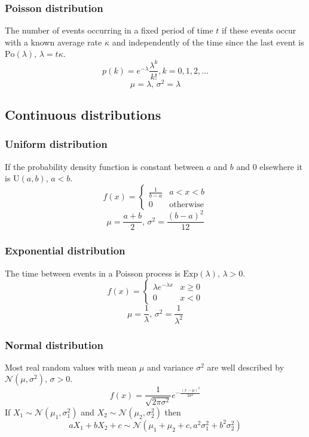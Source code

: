 \subsubsection{Poisson distribution}
The number of events occurring in a fixed period of time $t$ if these events occur with a known average rate $\kappa$ and independently of the time since the last event is $\textrm{Po}(\lambda),\,\lambda=t\kappa$.
\[p(k)=e^{-\lambda}\frac{\lambda^k}{k!}, k=0,1,2,\dots\]
\[\mu=\lambda,\,\sigma^2=\lambda\]

\subsection{Continuous distributions}

\subsubsection{Uniform distribution}
If the probability density function is constant between $a$ and $b$ and 0 elsewhere it is $\textrm{U}(a,b),\,a<b$.
\[f(x) = \left\{
	\begin{array}{cl}
		\frac{1}{b-a} & a<x<b\\
		0 & \textrm{otherwise}
	\end{array}\right.\]
	\[\mu=\frac{a+b}{2},\,\sigma^2=\frac{(b-a)^2}{12}\]
	
	\subsubsection{Exponential distribution}
	The time between events in a Poisson process is $\textrm{Exp}(\lambda),\,\lambda>0$.
	\[f(x) = \left\{
		\begin{array}{cl}
			\lambda e^{-\lambda x} & x\geq0\\
			0 & x<0
		\end{array}\right.\]
		\[\mu=\frac{1}{\lambda},\,\sigma^2=\frac{1}{\lambda^2}\]
		
		\subsubsection{Normal distribution}
		Most real random values with mean $\mu$ and variance $\sigma^2$ are well described by $\mathcal{N}(\mu,\sigma^2),\,\sigma>0$.
		\[ f(x) = \frac{1}{\sqrt{2\pi\sigma^2}}e^{-\frac{(x-\mu)^2}{2\sigma^2}} \]
		If $X_1 \sim \mathcal{N}(\mu_1,\sigma_1^2)$ and $X_2 \sim \mathcal{N}(\mu_2,\sigma_2^2)$ then
		\[ aX_1 + bX_2 + c \sim \mathcal{N}(\mu_1+\mu_2+c,a^2\sigma_1^2+b^2\sigma_2^2) \]
		
